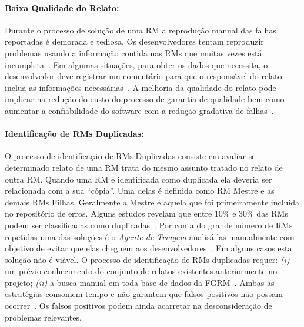 \paragraph{Baixa Qualidade do Relato:}

Durante o processo de solução de uma RM a reprodução manual das falhas
reportadas é demorada e tediosa. Os desenvolvedores tentam reproduzir problemas
usando a informação contida nas RMs que muitas vezes está
incompleta~\cite{White:2015:GRR:2820282.2820291}. Em algumas situações, para
obter os dados que necessita, o desenvolvedor deve registrar um comentário para
que o responsável do relato inclua as informações necessárias~\cite{5070993}. A
melhoria da qualidade do relato pode implicar na redução do custo do processo de
garantia de qualidade bem como aumentar a confiabilidade do software com a
redução gradativa de falhas~\cite{Tu:2014:MQI:2677832.2677844}.



\paragraph{Identificação de RMs Duplicadas:}

O processo de identificação de RMs Duplicadas consiste em avaliar se determinado
relato de uma RM trata do mesmo assunto tratado no relato de outra RM\@. Quando
uma RM é identificada como duplicada ela deveria ser relacionada com a sua
``cópia''. Uma delas é definida como RM Mestre e as demais RMs Filhas.
Geralmente a Mestre é aquela que foi primeiramente incluída no repositório de
erros. Alguns estudos revelam que entre 10\% e 30\% das RMs podem ser
classificadas como
duplicadas~\cite{anvik2005coping,cavalcanti2013bug,Runeson:2007:DDD:1248820.1248882}.
Por conta do grande número de RMs repetidas uma das soluções é o \textit{Agente
    de Triagem} analisá-las manualmente com objetivo de evitar que elas cheguem
aos desenvolvedores~\cite{anvik2005coping}. Em alguns casos esta solução não é
viável. O processo de identificação de RMs duplicadas requer: \textit{(i)} um
prévio conhecimento do conjunto de relatos existentes anteriormente no projeto;
\textit{(ii)} a busca manual em toda base de dados da
FGRM~\cite{banerjee2012automated,
    Lerch:2013:FDY:2495256.2495763,hindle2016contextual}. Ambas as estratégias
consomem tempo e não garantem que falsos positivos não possam
ocorrer~\cite{kaushik2012comparative}. Os falsos positivos podem ainda acarretar
na desconsideração de problemas relevantes.

